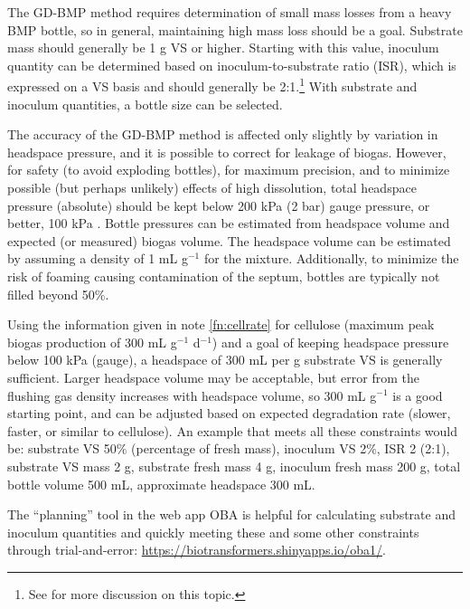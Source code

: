 \documentclass[]{article}
\begin{document}
The GD-BMP method requires determination of small mass losses from a heavy BMP bottle, so in general, maintaining high mass loss should be a goal.
Substrate mass should generally be 1 g VS or higher.
Starting with this value, inoculum quantity can be determined based on inoculum-to-substrate ratio (ISR), which is expressed on a VS basis and should generally be 2:1.\footnote{See \citet{holligerStandardizationBiomethanePotential2016} for more discussion on this topic.}
With substrate and inoculum quantities, a bottle size can be selected.

The accuracy of the GD-BMP method is affected only slightly by variation in headspace pressure, and it is possible to correct for leakage of biogas. 
However, for safety (to avoid exploding bottles), for maximum precision, and to minimize possible (but perhaps unlikely) effects of high  dissolution, total headspace pressure (absolute) should be kept below 200 kPa (2 bar) gauge pressure, or better, 100 kPa \citep{hafnerSystematicErrorManometric2019}. 
Bottle pressures can be estimated from headspace volume and expected (or measured) biogas volume.
The headspace volume can be estimated by assuming a density of 1 mL g$^{-1}$ for the mixture.
Additionally, to minimize the risk of foaming causing contamination of the septum, bottles are typically not filled beyond 50\%.

Using the information given in note \ref{fn:cellrate} for cellulose (maximum peak biogas production of 300 mL g$^{-1}$ d$^{-1}$) and a goal of keeping headspace pressure below 100 kPa (gauge), a headspace of 300 mL per g substrate VS is generally sufficient.
Larger headspace volume may be acceptable, but error from the flushing gas density increases with headspace volume, so 300 mL g$^{-1}$ is a good starting point, and can be adjusted based on expected degradation rate (slower, faster, or similar to cellulose). An example that meets all these constraints would be: substrate VS 50\% (percentage of fresh mass), inoculum VS 2\%, ISR 2 (2:1), substrate VS mass 2 g, substrate fresh mass 4 g, inoculum fresh mass 200 g, total bottle volume 500 mL, approximate headspace 300 mL.

The ``planning'' tool in the web app OBA is helpful for calculating substrate and inoculum quantities and quickly meeting these and some other constraints through trial-and-error: \url{https://biotransformers.shinyapps.io/oba1/}.
\end{document}
